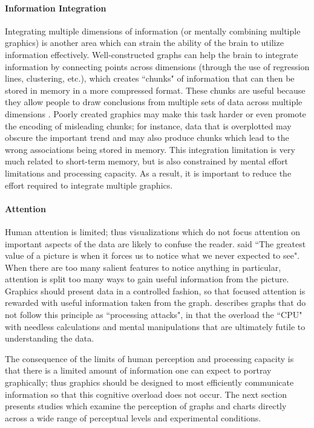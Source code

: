 \documentclass[11pt]{isuthesis}\usepackage[]{graphicx}\usepackage[]{color}
\begin{document}
\paragraph{Information Integration}
Integrating multiple dimensions of information (or mentally combining multiple graphics) is another area which can strain the ability of the brain to utilize information effectively. Well-constructed graphs can help the brain to integrate information by connecting points across dimensions (through the use of regression lines, clustering, etc.), which creates ``chunks" of information that can then be stored in memory in a more compressed format. These chunks are useful because they allow people to draw conclusions from multiple sets of data across multiple dimensions \citep{gattis1996mapping}. Poorly created graphics may make this task harder or even promote the encoding of misleading chunks; for instance, data that is overplotted may obscure the important trend and may also produce chunks which lead to the wrong associations being stored in memory. This integration limitation is very much related to short-term memory, but is also constrained by mental effort limitations and processing capacity. As a result, it is important to reduce the effort required to integrate multiple graphics. 

\paragraph{Attention}
Human attention is limited; thus visualizations which do not focus attention on important aspects of the data are likely to confuse the reader. \citet{eda} said ``The greatest value of a picture is when it forces us to notice what we never expected to see". When there are too many salient features to notice anything in particular, attention is split too many ways to gain useful information from the picture. Graphics should present data in a controlled fashion, so that focused attention is rewarded with useful information taken from the graph. \citet{conti2005attacking} describes graphs that do not follow this principle as ``processing attacks", in that the overload the ``CPU" with needless calculations and mental manipulations that are ultimately futile to understanding the data. 

The consequence of the limits of human perception and processing capacity is that there is a limited amount of information one can expect to portray graphically; thus graphics should be designed to most efficiently communicate information so that this cognitive overload does not occur. The next section presents studies which examine the perception of graphs and charts directly across a wide range of perceptual levels and experimental conditions. 
\end{document}
